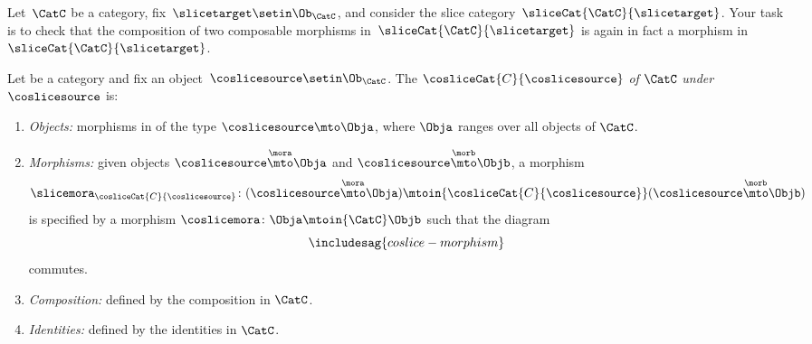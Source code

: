 \begin{gradedexercise}
    \label{ex:SliceCat}
    Let~$\CatC$ be a category, fix~$\slicetarget \setin \Ob_{\CatC}$, and consider the slice category~$\sliceCat{\CatC}{\slicetarget}$.
    Your task is to check that the composition of two composable morphisms in~$\sliceCat{\CatC}{\slicetarget}$ is again in fact a morphism in~$\sliceCat{\CatC}{\slicetarget}$.
\end{gradedexercise}


\begin{ctdefinition}
    \label{def:coslice-category}

    Let \CatC be a category and fix an object~$\coslicesource \setin \Ob_\CatC$.
    The  $\cosliceCat{C}{\coslicesource}$ \emph{of} $\CatC$ \emph{under} $\coslicesource$ is:
    \begin{enumerate}
        \item \emph{Objects:} morphisms in \CatC of the type $\coslicesource \mto \Obja$, where $\Obja$ ranges over all objects of $\CatC$.
        \item \emph{Morphisms:} given objects $\coslicesource \overset{\mora}{\mto} \Obja$ and $\coslicesource  \overset{\morb}{\mto} \Objb$, a morphism
              \begin{equation}
                  \slicemora_{\cosliceCat{C}{\coslicesource}} \colon (\coslicesource \overset{\mora}{\mto} \Obja)
                  \mtoin{\cosliceCat{C}{\coslicesource}}
                  (\coslicesource \overset{\morb}{\mto} \Objb)
              \end{equation}
              is specified by a morphism $\coslicemora \colon \Obja \mtoin{\CatC} \Objb$ such that the diagram
              \begin{equation}\label{eq:coslice-morphism}
                  \includesag{coslice-morphism}
              \end{equation}
              commutes.

        \item \emph{Composition:} defined by the composition in $\CatC$.
        \item \emph{Identities:} defined by the identities in $\CatC$.
    \end{enumerate}
\end{ctdefinition}

